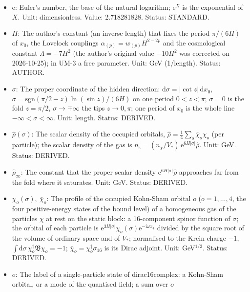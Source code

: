 \documentclass[
  10pt,
]{article}
\providecommand{\tightlist}{%
  \setlength{\itemsep}{0pt}\setlength{\parskip}{0pt}}
\begin{document}
\begin{itemize}
\tightlist
\item
  \(\mathrm{e}\): Euler's number, the base of the natural logarithm;
  \(\mathrm{e}^{X}\) is the exponential of \(X\). Unit: dimensionless.
  Value: 2.718281828. Status: STANDARD.
\item
  \(H\): The author's constant (an inverse length) that fixes the period
  \(\pi/(6H)\) of \(x_0\), the Lovelock couplings
  \(\alpha_{(p)} = w_{(p)}H^{2-2p}\) and the cosmological constant
  \(\Lambda = -7H^2\) (the author's original value \(-10H^2\) was
  corrected on 2026-10-25); in UM-3 a free parameter. Unit: GeV
  (1/length). Status: AUTHOR.
\item
  \(\sigma\): The proper coordinate of the hidden direction:
  \(\mathrm{d}\sigma = \lvert\cot z\rvert\,\mathrm{d}x_0\),
  \(\sigma = \mathrm{sgn}(\pi/2 - z)\ln(\sin z)/(6H)\) on one period
  \(0 < z < \pi\); \(\sigma = 0\) is the fold \(z = \pi/2\),
  \(\sigma \to \mp\infty\) the tips \(z \to 0, \pi\); one period of
  \(x_0\) is the whole line \(-\infty < \sigma < \infty\). Unit: length.
  Status: DERIVED.
\item
  \(\hat\rho(\sigma)\): The scalar density of the occupied orbitals,
  \(\hat\rho = \frac14\sum_o\bar\chi_o\chi_o\) (per particle); the
  scalar density of the gas is
  \(n_{\mathrm{s}} = (n_\chi/V_*)\,\mathrm{e}^{6H\lvert\sigma\rvert}\hat\rho\).
  Unit: GeV. Status: DERIVED.
\item
  \(\hat\rho_\infty\): The constant that the proper scalar density
  \(\mathrm{e}^{6H\lvert\sigma\rvert}\hat\rho\) approaches far from the
  fold where it saturates. Unit: GeV. Status: DERIVED.
\item
  \(\chi_o(\sigma),\ \bar\chi_o\): The profile of the occupied Kohn-Sham
  orbital \(o\) (\(o = 1, \dots, 4\), the four positive-energy states of
  the bound level) of a homogeneous gas of the particles \(\chi\) at
  rest on the static block: a 16-component spinor function of
  \(\sigma\); the orbital of each particle is
  \(\mathrm{e}^{3H\lvert\sigma\rvert}\chi_o(\sigma)\mathrm{e}^{-\mathrm{i}\omega x_4}\)
  divided by the square root of the volume of ordinary space and of
  \(V_*\); normalised to the Krein charge \(-1\),
  \(\int\mathrm{d}\sigma\,\chi_o^\dagger\mathfrak{B}\chi_o = -1\);
  \(\bar\chi_o = \chi_o^\dagger\sigma_{16}\) is its Dirac adjoint. Unit:
  GeV\(^{1/2}\). Status: DERIVED.
\item
  \(o\): The label of a single-particle state of dirac16complex: a
  Kohn-Sham orbital, or a mode of the quantised field; a sum over \(o\)

\end{itemize}
\end{document}
